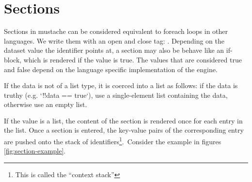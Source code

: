 \documentclass[thesis.tex]{subfiles}
\begin{document}
\section{Sections}
\label{app:mustache-section}
Sections in mustache can be considered equivalent to foreach loops in other
languages. We write them with an open and close tag:
.
Depending on the dataset value the identifier points at, a section may also be
behave like an if-block, which is rendered if the value is true. The values that
are considered true and false depend on the language specific implementation
of the engine.
\begin{citequote}{\cite[sections.yml]{MSTSPEC}}
	If the data is not of a list type, it is coerced into a list as follows: if
	the data is truthy (e.g. `!!data == true`), use a single-element list
	containing the data, otherwise use an empty list.
\end{citequote}
If the value is a list, the content of the section is rendered once for each
entry in the list. Once a section is entered, the key-value pairs of the
corresponding entry are pushed onto the stack of identifiers\footnote{This is
called the ``context stack''}.\
Consider the example in figures \ref{fig:section-example}.
\end{document}
